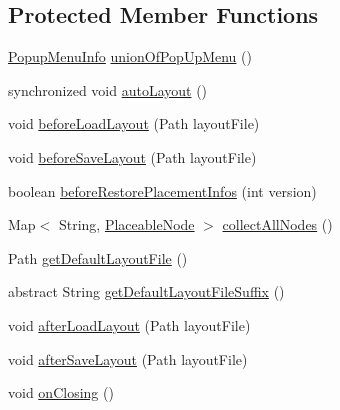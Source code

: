 \subsection*{Protected Member Functions}
\begin{DoxyCompactItemize}
\item 
\hyperlink{classorg_1_1tzi_1_1use_1_1gui_1_1views_1_1diagrams_1_1_diagram_view_1_1_popup_menu_info}{Popup\-Menu\-Info} \hyperlink{classorg_1_1tzi_1_1use_1_1gui_1_1views_1_1diagrams_1_1_diagram_view_aa355a38fa3369bb1aa9d708820c17f77}{union\-Of\-Pop\-Up\-Menu} ()
\item 
synchronized void \hyperlink{classorg_1_1tzi_1_1use_1_1gui_1_1views_1_1diagrams_1_1_diagram_view_a5a902c93ee53805d44dab92dfaa333ce}{auto\-Layout} ()
\item 
void \hyperlink{classorg_1_1tzi_1_1use_1_1gui_1_1views_1_1diagrams_1_1_diagram_view_ad673af3e72624725a0f2c4b5af664938}{before\-Load\-Layout} (Path layout\-File)
\item 
void \hyperlink{classorg_1_1tzi_1_1use_1_1gui_1_1views_1_1diagrams_1_1_diagram_view_aec54a353a5e5818b60eae278e48c6767}{before\-Save\-Layout} (Path layout\-File)
\item 
boolean \hyperlink{classorg_1_1tzi_1_1use_1_1gui_1_1views_1_1diagrams_1_1_diagram_view_adb15a5a764d3f20e44cdfbaea10c29d5}{before\-Restore\-Placement\-Infos} (int version)
\item 
Map$<$ String, \hyperlink{classorg_1_1tzi_1_1use_1_1gui_1_1views_1_1diagrams_1_1elements_1_1_placeable_node}{Placeable\-Node} $>$ \hyperlink{classorg_1_1tzi_1_1use_1_1gui_1_1views_1_1diagrams_1_1_diagram_view_a9ed76ffe76f1bbee369bd52ee64f06d7}{collect\-All\-Nodes} ()
\item 
Path \hyperlink{classorg_1_1tzi_1_1use_1_1gui_1_1views_1_1diagrams_1_1_diagram_view_a946077371d3e76e55af44a20d8f30732}{get\-Default\-Layout\-File} ()
\item 
abstract String \hyperlink{classorg_1_1tzi_1_1use_1_1gui_1_1views_1_1diagrams_1_1_diagram_view_a4a14f75054694a56c8f15752b2b5a27f}{get\-Default\-Layout\-File\-Suffix} ()
\item 
void \hyperlink{classorg_1_1tzi_1_1use_1_1gui_1_1views_1_1diagrams_1_1_diagram_view_ac1240dec1f56081dccfab29ec39ab465}{after\-Load\-Layout} (Path layout\-File)
\item 
void \hyperlink{classorg_1_1tzi_1_1use_1_1gui_1_1views_1_1diagrams_1_1_diagram_view_a950f43223952d807f6b184416612e404}{after\-Save\-Layout} (Path layout\-File)
\item 
void \hyperlink{classorg_1_1tzi_1_1use_1_1gui_1_1views_1_1diagrams_1_1_diagram_view_a522cca931426b845f53be9155e584c38}{on\-Closing} ()

\end{DoxyCompactItemize}

